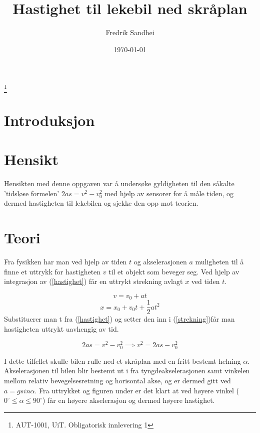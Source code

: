 \documentclass[11pt, a4paper]{article}
\begin{document}
\title{Hastighet til lekebil ned skråplan}
\author{Fredrik Sandhei}
\date{\today}
\maketitle
\footnote{AUT-1001, UiT. Obligatorisk innlevering 1}
\newpage

\section{Introduksjon}

\section{Hensikt}
Hensikten med denne oppgaven var å undersøke gyldigheten til den såkalte 'tidsløse formelen' $ 2as = v^{2} - v_{0}^{2} $ med hjelp av sensorer for å måle tiden, og dermed hastigheten til lekebilen og sjekke den opp mot teorien.

\section{Teori}
Fra fysikken har man ved hjelp av tiden $t$ og akselerasjonen $a$ muligheten til å finne et uttrykk for hastigheten $v$ til et objekt som beveger seg. Ved hjelp av integrasjon av (\ref{hastighet}) får en uttrykt strekning avlagt $x$ ved tiden $t$.

\begin{equation} \label{hastighet}
v = v_{0} + at
\end{equation}
\begin{equation} \label{strekning}
x = x_{0} + v_{0}t + \frac{1}{2}at^{2}
\end{equation}
Substituerer man t fra (\ref{hastighet}) og setter den inn i (\ref{strekning})får man hastigheten uttrykt uavhengig av tid.

\begin{equation}
2as = v^{2}-v_{0}^{2} \implies v^{2} = 2as-v_{0}^{2}
\end{equation}
\newline

I dette tilfellet skulle bilen rulle ned et skråplan med en fritt bestemt helning $\alpha$. Akselerasjonen til bilen blir bestemt ut i fra tyngdeakselerasjonen samt vinkelen mellom relativ bevegelsesretning og horisontal akse, og er dermed gitt ved $a = gsin \alpha$. Fra uttrykket og figuren under er det klart at ved høyere vinkel ($0^\circ \leq\alpha\leq 90^\circ$) får en høyere akselerasjon og dermed høyere hastighet.\newline
\end{document}
